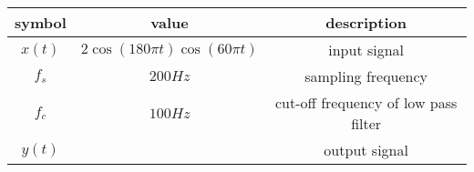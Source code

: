 
\begin{tabular}{|c|c|c|}
	\hline
	\textbf{symbol} & \textbf{value} & \textbf{description} \\
	\hline
	$x(t)$ & $2\cos{(180\pi t)}\cos{(60\pi t)}$ & input signal \\
	\hline
	$f_s$ & $200Hz$ & sampling frequency \\
	\hline
	$f_c$ & $100Hz$ & cut-off frequency of low pass filter  \\
	\hline
	$y(t)$ &  & output signal \\
	\hline
\end{tabular}
